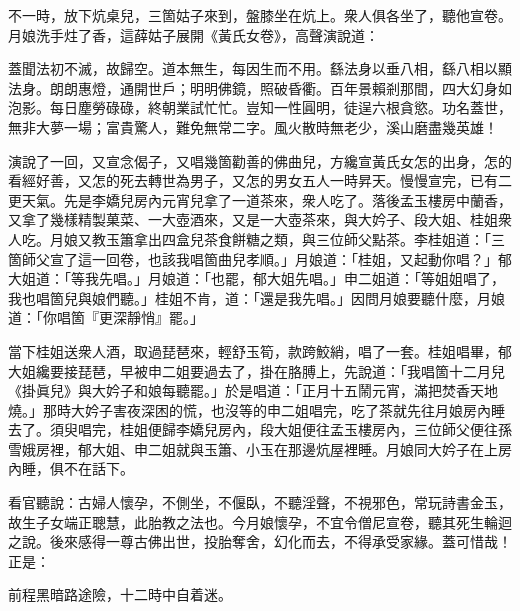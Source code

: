 不一時，放下炕桌兒，三箇姑子來到，盤膝坐在炕上。衆人俱各坐了，聽他宣卷。月娘洗手炷了香，這薛姑子展開《黃氏女卷》，高聲演說道：

\begin{myquote}[\markfont]
蓋聞法初不滅，故歸空。道本無生，每因生而不用。繇法身以垂八相，繇八相以顯法身。朗朗惠燈，通開世戶；明明佛鏡，照破昏衢。百年景賴剎那間，四大幻身如泡影。每日塵勞碌碌，終朝業試忙忙。豈知一性圓明，徒逞六根貪慾。功名蓋世，無非大夢一場；富貴驚人，難免無常二字。風火散時無老少，溪山磨盡幾英雄！
\end{myquote}

演說了一回，又宣念偈子，又唱幾箇勸善的佛曲兒，方纔宣黃氏女怎的出身，怎的看經好善，又怎的死去轉世為男子，又怎的男女五人一時昇天。慢慢宣完，已有二更天氣。先是李嬌兒房內元宵兒拿了一道茶來，衆人吃了。落後孟玉樓房中蘭香，又拿了幾樣精製菓菜、一大壺酒來，又是一大壺茶來，與大妗子、段大姐、桂姐衆人吃。月娘又教玉簫拿出四盒兒茶食餅糖之類，與三位師父點茶。李桂姐道：「三箇師父宣了這一回卷，也該我唱箇曲兒孝順。」月娘道：「桂姐，又起動你唱？」郁大姐道：「等我先唱。」月娘道：「也罷，郁大姐先唱。」申二姐道：「等姐姐唱了，我也唱箇兒與娘們聽。」桂姐不肯，道：「還是我先唱。」因問月娘要聽什麼，月娘道：「你唱箇『更深靜悄』罷。」

當下桂姐送衆人酒，取過琵琶來，輕舒玉筍，款跨鮫綃，唱了一套。桂姐唱畢，郁大姐纔要接琵琶，早被申二姐要過去了，{}掛在胳膊上，先說道：「我唱箇十二月兒《掛眞兒》與大妗子和娘每聽罷。」於是唱道：「正月十五鬧元宵，滿把焚香天地燒。」那時大妗子害夜深困的慌，也沒等的申二姐唱完，吃了茶就先往月娘房內睡去了。須臾唱完，桂姐便歸李嬌兒房內，段大姐便往孟玉樓房內，三位師父便往孫雪娥房裡，郁大姐、申二姐就與玉簫、小玉在那邊炕屋裡睡。月娘同大妗子在上房內睡，俱不在話下。

看官聽說：古婦人懷孕，不側坐，不偃臥，不聽淫聲，不視邪色，常玩詩書金玉，故生子女端正聰慧，此胎教之法也。今月娘懷孕，不宜令僧尼宣卷，聽其死生輪迴之說。後來感得一尊古佛出世，投胎奪舍，幻化而去，不得承受家緣。蓋可惜哉！正是：

\begin{myquote} 
前程黑暗路途險，十二時中自着迷。
\end{myquote} 


